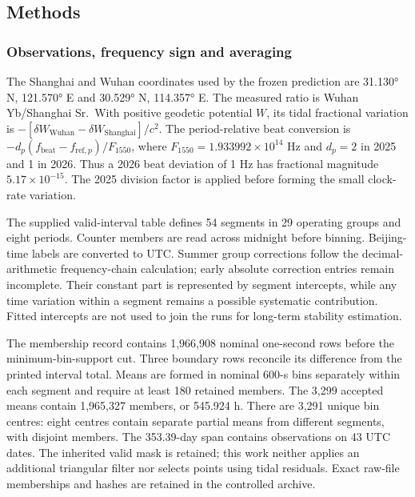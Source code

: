 \documentclass[
  12pt,
  a4paper,
]{article}
\begin{document}
\clearpage

\fontsize{12}{14.4}\selectfont\doublespacing

\hypertarget{methods}{%
\subsection{Methods}\label{methods}}

\hypertarget{observations-frequency-sign-and-averaging}{%
\subsubsection{Observations, frequency sign and
averaging}\label{observations-frequency-sign-and-averaging}}

The Shanghai and Wuhan coordinates used by the frozen prediction are
31.130° N, 121.570° E and 30.529° N, 114.357° E. The measured ratio is
Wuhan Yb/Shanghai Sr.~With positive geodetic potential \(W\), its tidal
fractional variation is
\(-[\delta W_{\mathrm{Wuhan}}-\delta W_{\mathrm{Shanghai}}]/c^2\). The
period-relative beat conversion is
\(-d_p(f_{\mathrm{beat}}-f_{{\mathrm{ref}},p})/F_{1550}\), where
\(F_{1550}=1.933992\times10^{14}\) Hz and \(d_p=2\) in 2025 and 1 in
2026. Thus a 2026 beat deviation of 1 Hz has fractional magnitude
\(5.17\times10^{-15}\). The 2025 division factor is applied before
forming the small clock-rate variation.

The supplied valid-interval table defines 54 segments in 29 operating
groups and eight periods. Counter members are read across midnight
before binning. Beijing-time labels are converted to UTC. Summer group
corrections follow the decimal-arithmetic frequency-chain calculation;
early absolute correction entries remain incomplete. Their constant part
is represented by segment intercepts, while any time variation within a
segment remains a possible systematic contribution. Fitted intercepts
are not used to join the runs for long-term stability estimation.

The membership record contains 1,966,908 nominal one-second rows before
the minimum-bin-support cut. Three boundary rows reconcile its
difference from the printed interval total. Means are formed in nominal
600-s bins separately within each segment and require at least 180
retained members. The 3,299 accepted means contain 1,965,327 members, or
545.924 h. There are 3,291 unique bin centres: eight centres contain
separate partial means from different segments, with disjoint members.
The 353.39-day span contains observations on 43 UTC dates. The inherited
valid mask is retained; this work neither applies an additional
triangular filter nor selects points using tidal residuals. Exact
raw-file memberships and hashes are retained in the controlled archive.
\end{document}
